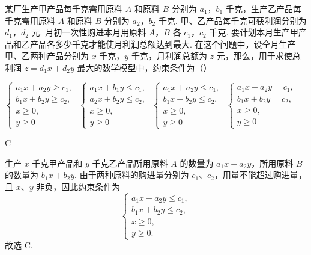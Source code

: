\begin{problem}
某厂生产甲产品每千克需用原料 \(A\) 和原料 \(B\) 分别为 \(a_{1}\)，\(b_{1}\) 千克，生产乙产品每千克需用原料 \(A\) 和原料 \(B\) 分别为 \(a_{2}\)，\(b_{2}\) 千克. 甲、乙产品每千克可获利润分别为 \(d_{1}\)，\(d_{2}\) 元. 月初一次性购进本月用原料 \(A\)，\(B\) 各 \(c_{1}\)，\(c_{2}\) 千克. 要计划本月生产甲产品和乙产品各多少千克才能使月利润总额达到最大. 在这个问题中，设全月生产甲、乙两种产品分别为 \(x\) 千克，\(y\) 千克，月利润总额为 \(z\) 元，那么，用于求使总利润 \(z=d_{1}x+d_{2}y\) 最大的数学模型中，约束条件为（\quad）

\choices
    {\(\begin{cases}
a_{1}x + a_{2}y \geqslant c_{1},\\
b_{1}x + b_{2}y \geqslant c_{2},\\
x \geqslant 0,\\
y \geqslant 0
\end{cases}\)}
    {\(\begin{cases}
a_{1}x + b_{1}y \leqslant c_{1},\\
a_{2}x + b_{2}y \leqslant c_{2},\\
x \geqslant 0,\\
y \geqslant 0
\end{cases}\)}
    {\(\begin{cases}
a_{1}x + a_{2}y \leqslant c_{1},\\
b_{1}x + b_{2}y \leqslant c_{2},\\
x \geqslant 0,\\
y \geqslant 0
\end{cases}\)}
	{\(\begin{cases}
a_{1}x + a_{2}y = c_{1},\\
b_{1}x + b_{2}y = c_{2},\\
x \geqslant 0,\\
y \geqslant 0
\end{cases}\)}
\end{problem}

\begin{answer}
C
\end{answer}

\begin{solution}
生产 \(x\) 千克甲产品和 \(y\) 千克乙产品所用原料 \(A\) 的数量为 \(a_1x+a_2y\)，所用原料 \(B\) 的数量为 \(b_1x+b_2y\). 由于两种原料的购进量分别为 \(c_1\)、\(c_2\)，用量不能超过购进量，且 \(x\)、\(y\) 非负，因此约束条件为
\[
\begin{cases}
a_1x+a_2y\leqslant c_1,\\
b_1x+b_2y\leqslant c_2,\\
x\geqslant0,\\
y\geqslant0.
\end{cases}
\]
故选 C.
\end{solution}

